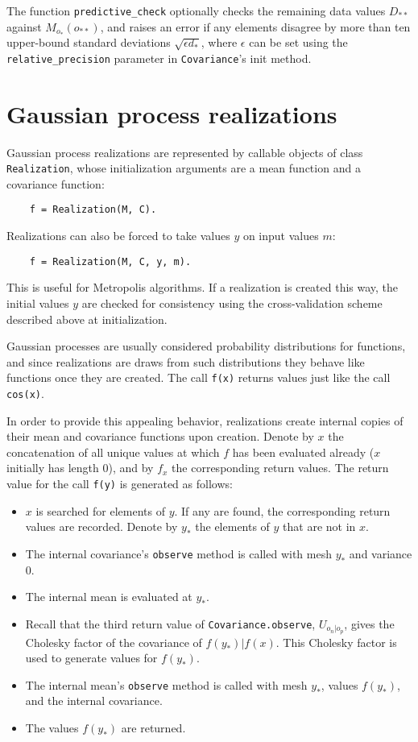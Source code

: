 \documentclass{report}
\begin{document}
The function \texttt{predictive\_check} optionally checks the remaining data values $D_{**}$ against $M_{o_*}(o_{**})$, and raises an error if any elements disagree by more than ten upper-bound standard deviations $\sqrt{\epsilon d_*}$, where $\epsilon$ can be set using the \texttt{relative\_precision} parameter in \texttt{Covariance}'s init method.

\section{Gaussian process realizations}

Gaussian process realizations are represented by callable objects of class \texttt{Realization}, whose initialization arguments are a mean function and a covariance function:
\begin{verbatim}
    f = Realization(M, C).
\end{verbatim}
Realizations can also be forced to take values $y$ on input values $m$:
\begin{verbatim}
    f = Realization(M, C, y, m).
\end{verbatim}
This is useful for Metropolis algorithms. If a realization is created this way, the initial values $y$ are checked for consistency using the cross-validation scheme described above at initialization.

Gaussian processes are usually considered probability distributions for functions, and since realizations are draws from such distributions they behave like functions once they are created. The call \texttt{f(x)} returns values just like the call \texttt{cos(x)}.

\bigskip
In order to provide this appealing behavior, realizations create internal copies of their mean and covariance functions upon creation. Denote by $x$ the concatenation of all unique values at which $f$ has been evaluated already ($x$ initially has length 0), and by $f_x$ the corresponding return values. The return value for the call \texttt{f(y)} is generated as follows:
\begin{itemize}
    \item $x$ is searched for elements of $y$. If any are found, the corresponding return values are recorded. Denote by $y_*$ the elements of $y$ that are not in $x$.
    \item The internal covariance's \texttt{observe} method is called with mesh $y_*$ and variance 0.
    \item The internal mean is evaluated at $y_*$.
    \item Recall that the third return value of \texttt{Covariance.observe}, $U_{o_n|o_p}$, gives the Cholesky factor of the covariance of $f(y_*)|f(x)$. This Cholesky factor is used to generate values for $f(y_*)$.
    \item The internal mean's \texttt{observe} method is called with mesh $y_*$, values $f(y_*)$, and the internal covariance.
    \item The values $f(y_*)$ are returned.
\end{itemize}
\end{document}
